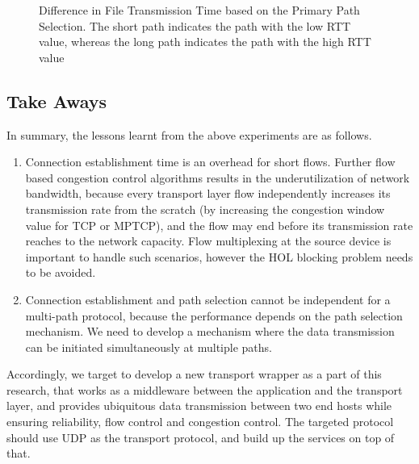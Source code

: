 \begin{figure}[!t]
\begin{center}
\begin{minipage}{0.45\linewidth}
			\label{fig:timeSentOverPathRTT320}
		\end{minipage}
		\caption{\label{fig:timeSentOverPath}Difference in File Transmission Time based on the Primary Path Selection. The short path indicates the path with the low RTT value, whereas the long path indicates the path with the high RTT value}
	\end{center}
\end{figure}

%

\subsection{Take Aways}
In summary, the lessons learnt from the above experiments are as follows.
\begin{enumerate}
	\item Connection establishment time is an overhead for short flows. Further flow based congestion control algorithms results in the underutilization of network bandwidth, because every transport layer flow independently increases its transmission rate from the scratch (by increasing the congestion window value for TCP or MPTCP), and the flow may end before its transmission rate reaches to the network capacity. Flow multiplexing at the source device is important to handle such scenarios, however the HOL blocking problem needs to be avoided. 
	\item Connection establishment and path selection cannot be independent for a multi-path protocol, because the performance depends on the path selection mechanism. We need to develop a mechanism where the data transmission can be initiated simultaneously at multiple paths.   
\end{enumerate}
Accordingly, we target to develop a new transport wrapper as a part of this research, that works as a middleware between the application and the transport layer, and provides ubiquitous data transmission between two end hosts while ensuring reliability, flow control and congestion control.  The targeted protocol should use UDP as the transport protocol, and build up the services on top of that. 

